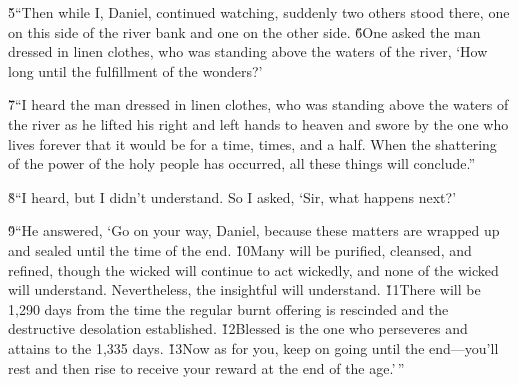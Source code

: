 \v{5}``Then while I, Daniel, continued watching, suddenly two others stood there, one on this side of the river bank and one on the other side. \v{6}One asked the man dressed in linen clothes, who was standing above the waters of the river, `How long until the fulfillment of the wonders?'

\v{7}``I heard the man dressed in linen clothes, who was standing above the waters of the river as he lifted his right and left hands to heaven and swore by the one who lives forever that it would be for a time, times, and a half. When the shattering of the power of the holy people has occurred, all these things will conclude.''

\v{8}``I heard, but I didn't understand. So I asked, `Sir, what happens next?'

\v{9}``He answered, `Go on your way, Daniel, because these matters are wrapped up and sealed until the time of the end. \v{10}Many will be purified, cleansed, and refined, though the wicked will continue to act wickedly, and none of the wicked will understand. Nevertheless, the insightful will understand. \v{11}There will be 1,290 days from the time the regular burnt offering is rescinded and the destructive desolation established. \v{12}Blessed is the one who perseveres and attains to the 1,335 days. \v{13}Now as for you, keep on going until the end---you'll rest and then rise to receive your reward at the end of the age.'\,''
